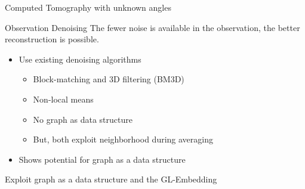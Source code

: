 \begin{frame}{Computed Tomography with unknown angles}
\end{frame}





\begin{frame}{Observation Denoising}
  The fewer noise is available in the observation, the better reconstruction is possible.
  
  \pause
  \begin{itemize}
    \item Use existing denoising algorithms
    \begin{itemize}
      \item Block-matching and 3D filtering (BM3D) \cite{bm3d}
      \item Non-local means \cite{noneLocalMean}
      \item No graph as data structure
      \item But, both exploit neighborhood during averaging
    \end{itemize}
    \item<3-> \alert<3->{Shows potential for graph as a data structure}
  \end{itemize}

  \begin{tcolorbox}[colback=red!5!white,hide=<1-3>, alert=<4>, colframe=red!75!black]
    Exploit graph as a data structure and the GL-Embedding
\end{tcolorbox}

  
\end{frame}
